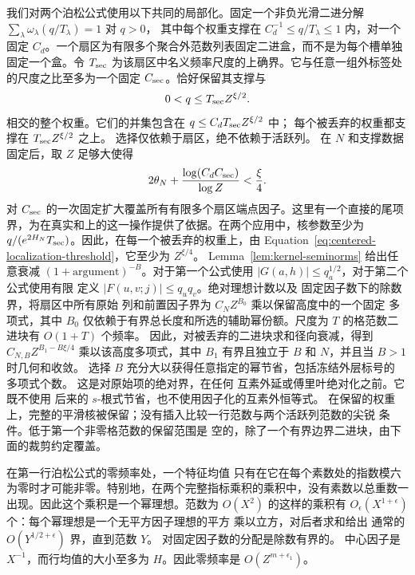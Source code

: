 \documentclass[11pt,a4paper]{article}
\numberwithin{equation}{section}
\numberwithin{figure}{section}
\theoremstyle{definition}
\theoremstyle{remark}
\begin{document}
我们对两个泊松公式使用以下共同的局部化。固定一个非负光滑二进分解
\(\sum_\lambda\omega_\lambda(q/T_\lambda)=1\) 对 \(q>0\)，
其中每个权重支撑在 \(C_d^{-1}\le q/T_\lambda\le1\)
内，对一个固定 \(C_d\)。一个扇区为有限多个聚合外范数列表固定二进盒，而不是为每个槽单独固定一个盒。令 \(T_{\rm sec}\) 为该扇区中名义频率尺度的上确界。它与任意一组外标签处的尺度之比至多为一个固定
\(C_{\rm sec}\)。恰好保留其支撑与
\[
 0<q\le T_{\rm sec}Z^{\xi/2}.
\]
相交的整个权重。它们的并集包含在 \(q\le C_dT_{\rm sec}Z^{\xi/2}\) 中；
每个被丢弃的权重都支撑在 \(T_{\rm sec}Z^{\xi/2}\) 之上。
选择仅依赖于扇区，绝不依赖于活跃列。
在 \(N\) 和支撑数据固定后，取 \(Z\) 足够大使得
\begin{equation}
 2\theta_N+\frac{\log(C_dC_{\rm sec})}{\log Z}<\frac\xi4.
 \label{eq:centered-localization-threshold}
\end{equation}
对 \(C_{\rm sec}\) 的一次固定扩大覆盖所有有限多个扇区端点因子。这里有一个直接的尾项界，为在真实和上的这一操作提供了依据。在两个应用中，核参数至少为
\(q/(e^{2H_N}T_{\rm sec})\)。因此，在每一个被丢弃的权重上，由
Equation~\eqref{eq:centered-localization-threshold}，它至少为 \(Z^{\xi/4}\)。
Lemma~\ref{lem:kernel-seminorms} 给出任意衰减
\((1+\text{argument})^{-B}\)。对于第一个公式使用
\(|G(a,h)|\le q_a^{1/2}\)，对于第二个公式使用有限
定义 \(|F(u,v;j)|\le q_uq_v\)。绝对理想计数以及
固定因子数下的除数界，将扇区中所有原始
列和前置因子界为 \(C_NZ^{B_0}\) 乘以保留高度中的一个固定
多项式，其中 \(B_0\) 仅依赖于有界总长度和所选的辅助幂份额。尺度为 \(T\) 的格范数二进块有 \(O(1+T)\) 个频率。
因此，对被丢弃的二进块求和径向衰减，得到
\(C_{N,B}Z^{B_1-B\xi/4}\) 乘以该高度多项式，其中 \(B_1\) 有界且独立于 \(B\) 和 \(N\)，并且当 \(B>1\) 时几何和收敛。
选择 \(B\) 充分大以获得任意指定的幂节省，包括冻结外层标号的
多项式个数。
这是对原始项的绝对界，在任何
互素外延或傅里叶绝对化之前。它既不使用
后来的 \(s\)-根式节省，也不使用因子化的互素外恒等式。
在保留的权重上，完整的平滑核被保留；没有插入比较一行范数与两个活跃列范数的尖锐
条件。低于第一个非零格范数的保留范围是
空的，除了一个有界边界二进块，由下面的裁剪约定覆盖。

在第一行泊松公式的零频率处，一个特征均值
只有在它在每个素数处的指数模六为零时才可能非零。特别地，在两个完整指标乘积的乘积中，没有素数以总重数一出现。因此这个乘积是一个幂理想。范数为 \(O(X^2)\) 的这样的乘积有 \(O_\epsilon(X^{1+\epsilon})\)
个：每个幂理想是一个无平方因子理想的平方
乘以立方，对后者求和给出
通常的 \(O(Y^{1/2+\epsilon})\) 界，直到范数 \(Y\)。
对固定因子数的分配是除数有界的。
中心因子是 \(X^{-1}\)，而行均值的大小至多为
\(H\)。因此零频率是 \(O(Z^{m+\epsilon_1})\)。
\end{document}
